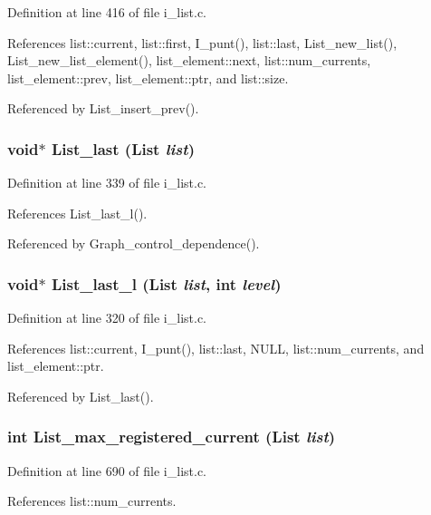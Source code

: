 Definition at line 416 of file i\_\-list.c.

References list::current, list::first, I\_\-punt(), list::last, List\_\-new\_\-list(), List\_\-new\_\-list\_\-element(), list\_\-element::next, list::num\_\-currents, list\_\-element::prev, list\_\-element::ptr, and list::size.

Referenced by List\_\-insert\_\-prev().
\subsubsection{\setlength{\rightskip}{0pt plus 5cm}void$\ast$ List\_\-last (\bf{List} {\em list})}\label{i__list_8h_e3a111d9146a0c4bbf2efa8948cf13ee}




Definition at line 339 of file i\_\-list.c.

References List\_\-last\_\-l().

Referenced by Graph\_\-control\_\-dependence().
\subsubsection{\setlength{\rightskip}{0pt plus 5cm}void$\ast$ List\_\-last\_\-l (\bf{List} {\em list}, int {\em level})}\label{i__list_8h_52b36d070b2e10a259aea2cbfdf4d1e9}




Definition at line 320 of file i\_\-list.c.

References list::current, I\_\-punt(), list::last, NULL, list::num\_\-currents, and list\_\-element::ptr.

Referenced by List\_\-last().
\subsubsection{\setlength{\rightskip}{0pt plus 5cm}int List\_\-max\_\-registered\_\-current (\bf{List} {\em list})}\label{i__list_8h_922f0311a02bb6f7b05181999b560139}




Definition at line 690 of file i\_\-list.c.

References list::num\_\-currents.
